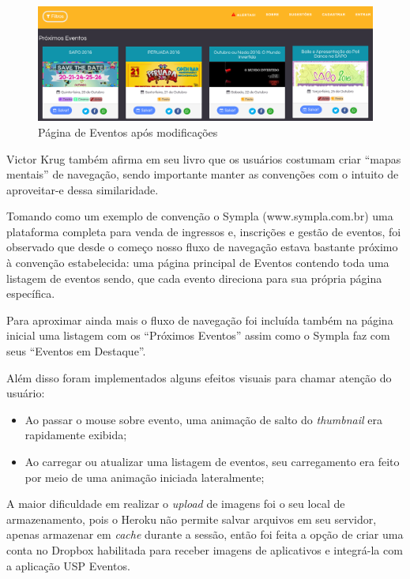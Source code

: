 \begin{figure}[htb]
\centering
\includegraphics[width=15cm]{figuras/events_page_3aiteracao}
\caption{\label{fig:events_page_3aiteracao} Página de Eventos após modificações}
\end{figure}
	\par Victor Krug também afirma em seu livro que os usuários costumam criar ``mapas mentais'' de navegação, sendo importante manter as convenções com o intuito de aproveitar-e dessa similaridade.
	\par Tomando como um exemplo de convenção o Sympla (www.sympla.com.br) uma plataforma completa para venda de ingressos e, inscrições e gestão de eventos, foi observado que desde o começo nosso fluxo de navegação estava bastante próximo à
convenção estabelecida: uma página principal de Eventos contendo toda uma listagem de eventos sendo, que cada evento direciona para sua própria página específica.
	\par Para aproximar ainda mais o fluxo de navegação foi incluída também na página inicial uma listagem com os ``Próximos Eventos'' assim como o Sympla faz com seus ``Eventos em Destaque''.
	\par Além disso foram implementados alguns efeitos visuais para chamar atenção do usuário:
	\begin{itemize}
	\item Ao passar o mouse sobre evento, uma animação de salto do \emph{thumbnail} era rapidamente exibida;
	\item Ao carregar ou atualizar uma listagem de eventos, seu carregamento era feito por meio de uma animação iniciada lateralmente;
	\end{itemize}
	\par A maior dificuldade em realizar o \emph{upload} de imagens foi o seu local de armazenamento, pois o Heroku não permite salvar arquivos em seu servidor, apenas armazenar em \emph{cache} durante a sessão, então foi feita a opção de criar uma conta no Dropbox habilitada para receber imagens de aplicativos e integrá-la com a aplicação USP Eventos.


